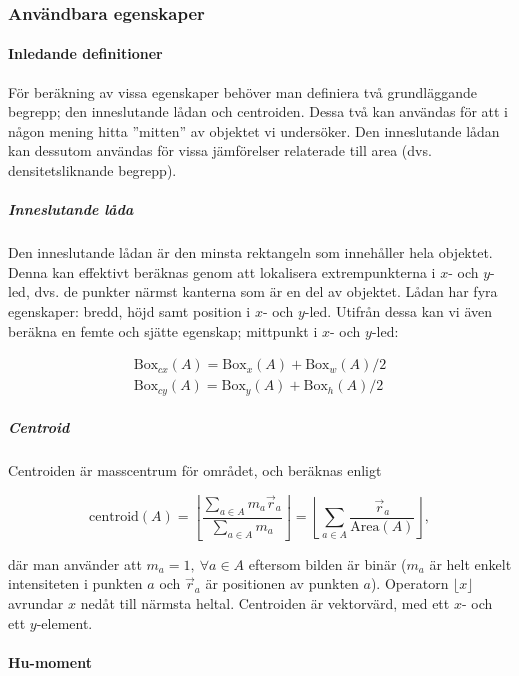 \documentclass[../rapport_MVEX01-11-05]{subfiles}
\begin{document}
\subsubsection{Användbara egenskaper}

\paragraph{Inledande definitioner}

För beräkning av vissa egenskaper behöver man definiera två
grundläggande begrepp; den inneslutande lådan och centroiden. Dessa
två kan användas för att i någon mening hitta ''mitten'' av objektet
vi undersöker. Den inneslutande lådan kan dessutom användas för vissa
jämförelser relaterade till area (dvs. densitetsliknande begrepp).

\subparagraph{Inneslutande låda}

Den inneslutande lådan är den minsta rektangeln som innehåller hela
objektet. Denna kan effektivt beräknas genom att lokalisera
extrempunkterna i $x$- och $y$-led, dvs. de punkter närmst kanterna
som är en del av objektet. Lådan har fyra egenskaper: bredd, höjd samt
position i $x$- och $y$-led. Utifrån dessa kan vi även beräkna en femte
och sjätte egenskap; mittpunkt i $x$- och $y$-led:

\begin{gather*}
  \textrm{Box}_{cx}(A) = \textrm{Box}_x(A) + \textrm{Box}_w(A)/2\\
  \textrm{Box}_{cy}(A) = \textrm{Box}_y(A) + \textrm{Box}_h(A)/2
\end{gather*}

\subparagraph{Centroid}

Centroiden är masscentrum för området, och beräknas enligt

\begin{equation*}
  \textrm{centroid}(A) = \left\lfloor\frac{
    \sum\limits_{a\in A}m_a\vec{r}_a
  }{
    \sum\limits_{a\in A}m_a
  }\right\rfloor =
  \left\lfloor\sum\limits_{a\in
  A}\frac{\vec{r}_a}{\textrm{Area}(A)}\right\rfloor,
\end{equation*}

där man använder att $m_a=1,\:\forall a\in A$ eftersom bilden är
binär ($m_a$ är helt enkelt intensiteten i punkten $a$ och
$\vec{r}_a$ är positionen av punkten $a$). Operatorn $\lfloor
x\rfloor$ avrundar $x$ nedåt till närmsta heltal. Centroiden är vektorvärd,
med ett $x$- och ett $y$-element.

\paragraph{Hu-moment}
\end{document}
